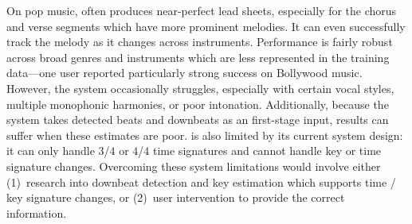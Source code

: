 On pop music, \sheetsage{} often produces near-perfect lead sheets, especially for the chorus and verse segments which have more prominent melodies. 
It can even successfully track the melody as it changes across instruments. 
Performance is fairly robust across broad genres and instruments which are less represented in the training data---one user reported particularly strong success on Bollywood music. 
However, the system occasionally struggles, especially with certain vocal styles, multiple monophonic harmonies, or poor intonation. 
Additionally, because the system takes detected beats and downbeats as an first-stage input, results can suffer when these estimates are poor. 
\sheetsage{} is also limited by its current system design: it can only handle $3$/$4$ or $4$/$4$ time signatures and cannot handle key or time signature changes. 
Overcoming these system limitations would involve either (1)~research into downbeat detection and key estimation which supports time / key signature changes, or (2)~user intervention to provide the correct information.